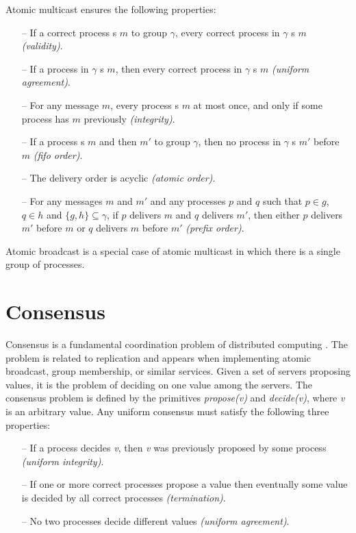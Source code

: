 Atomic multicast ensures the following properties:

\begin{itemize}

    \item[--] If a correct process \amcast{}s $m$ to group $\gamma$, every
    correct process in $\gamma$ \amdel{}s $m$ \emph{(validity)}.

    \item[--] If a process in $\gamma$ \amdel{}s $m$, then every correct process
    in $\gamma$ \amdel{}s $m$ \emph{(uniform agreement)}.

    \item[--] For any message $m$, every process \amdel{}s $m$ at most once, and
      only if some process has \amcast{} $m$ previously \emph{(integrity)}.

    \item[--] If a process \amcast{}s $m$ and then $m'$ to group $\gamma$, then
    no process in $\gamma$ \amdel{}s $m'$ before $m$ \emph{(fifo order)}.

    \item[--] The delivery order is acyclic \emph{(atomic order)}.

    \item[--] For any messages $m$ and $m'$ and any processes $p$ and $q$ such
      that $p \in g$, $q \in h$ and $\{ g, h \} \subseteq \gamma$, if $p$
      delivers $m$ and $q$ delivers $m'$, then either $p$ delivers $m'$ before
      $m$ or $q$ delivers $m$ before $m'$ \emph{(prefix order)}.

\end{itemize}

Atomic broadcast is a special case of atomic multicast in which there
is a single group of processes.

\section{Consensus}
\label{sec:consensus}
Consensus is a fundamental coordination problem of distributed computing
\cite{Lam78, santos2013htsmr}. The problem is related to replication and appears
when implementing atomic broadcast, group membership, or similar services. Given
a set of servers proposing values, it is the problem of deciding on one value
among the servers. The consensus problem is defined by the primitives
\emph{propose(v)} and \emph{decide(v)}, where \emph{v} is an arbitrary value.
Any uniform consensus must satisfy the following three properties:
\begin{itemize}

  \item[--] If a process decides \emph{v}, then \emph{v} was previously
  proposed by some process \emph{(uniform integrity)}.

  \item[--] If one or more correct processes propose a value then eventually
  some value is decided by all correct processes \emph{(termination)}.

  \item[--] No two processes decide different values \emph{(uniform agreement)}.

\end{itemize}

